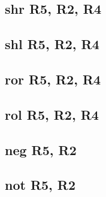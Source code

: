 \documentclass{article}
\begin{document}
    \subsection{shr R5, R2, R4} \label{SHR}
        
    \subsection{shl R5, R2, R4} \label{SHL}
        
    \subsection{ror R5, R2, R4} \label{ROR}
        
    \subsection{rol R5, R2, R4} \label{ROL}
        
    \subsection{neg R5, R2} \label{NEG}
        
    \subsection{not R5, R2} \label{NOT}
        
\end{document}
